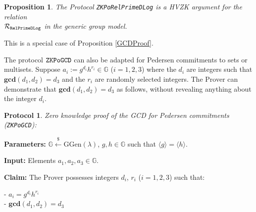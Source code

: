 \documentclass[11pt, lettersize, notitlepage, leqno, footskip=0.6cm]{article}
\newcommand{\bG}{\mathbb{G}}
\newcommand{\la}{\langle}
\newcommand{\ra}{\rangle}
\newcommand{\mc}{\mathcal}
\newcommand{\mb}{\mathbb}
\newcommand{\mbf}{\mathbf}
\newcommand{\mr}{\mathrm}
\newcommand{\lamb}{\lambda}
\newcommand{\noin}{\noindent}
\newcommand{\GCD}{\mbf{gcd}}
\newtheorem{Prop}[Thm]{Proposition}
\newtheorem{Prot}[Thm]{Protocol}
\numberwithin{equation}{section}
\begin{document}
\vspace{0.1cm}

\begin{Prop} The Protocol \verb|ZKPoRelPrimeDLog| is a HVZK argument for the relation\\ $\mc{R}_{{\tt{RelPrimeDLog}}}$ in the generic group model.\end{Prop}

\begin{prf} This is a special case of Proposition \ref{GCDProof}.\end{prf}

The protocol $\tt{ZKPoGCD}$ can also be adapted for Pedersen commitments to sets or multisets. Suppose $ a_i:= g^{d_i}h^{r_i}\in \bG $ ($i=1,2,3$) where the $d_i$ are integers such that $\GCD(d_1,d_2) = d_3$ and the $r_i$ are randomly selected integers. The Prover can demonstrate that $\GCD(d_1,d_2) = d_3$ as follows, without revealing anything about the integer $d_i$. \vspace{0.1cm}

\begin{Prot} \normalfont \hypertarget{GCDPedersen}{\textit{Zero knowledge proof of the GCD for Pedersen commitments}} (\verb|ZKPoGCD|):\end{Prot} \vspace{-0.3cm}

\noin \textbf{Parameters:} $\mb{G}\xleftarrow{\$} \mr{GGen}(\lamb)$,  $g,h\in \mb{G}$ such that $\la g \ra = \la h \ra$.

\noin \textbf{Input:} Elements $a_1, a_2, a_3\in \mb{G}$.

\noin \textbf{Claim:} The Prover possesses integers $d_i$, $r_i$ ($i=1,2,3$) such that:

\noin - $a_i = g^{d_i}h^{r_i}$\\
\noin - $\GCD(d_1, d_2) = d_3$
\end{document}
